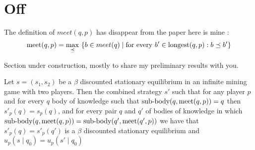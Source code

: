 

\section{Off}
The definition of $meet(q,p)$ has disappear from the paper here is mine :  
$$\meet(q,p)  =  {\displaystyle \max_{\preceq} \ \{b \in meet(q) \mid  \text{for every } b' \in \longest(q,p): b \preceq b'\}}$$

Section under construction, mostly to share my preliminary results with you.

\begin{mylem}
	Let $s = (s_1,s_2)$ be a $\beta$ discounted stationary equilibrium in an infinite mining game with two players. 
	Then the combined strategy $s'$ such that for any player $p$  and for every $q$ body of knowledge such that ${\text{\rm sub-body}}(q,\text{\rm meet}(q,p)) = q$ then $s'_p(q) = s_p(q)$,
	and for every pair $q$ and $q'$ of 
	bodies of knowledge in which ${\text{\rm sub-body}}(q,\text{\rm meet}(q,p)) = {\text{\rm sub-body}}(q',\text{\rm meet}(q',p))$ we have that 
	$s'_p(q) = s'_p(q')$ is a $\beta$ discounted stationary equilibrium and $u_p(s \mid q_0) = u_p(s' \mid q_0)$
\end{mylem}

